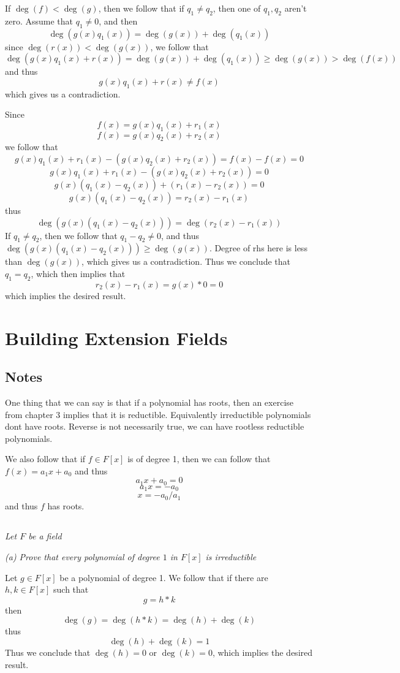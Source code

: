 \documentclass[11pt,oneside,titlepage]{book}
\begin{document}
If $\deg(f) < \deg(g)$, then we follow that if $q_1 \neq q_2$, then one of
$q_1, q_2$ aren't zero. Assume that $q_1 \neq 0$, and then
$$\deg(g(x)q_1(x)) = \deg(g(x)) + \deg(q_1(x))$$
since $\deg(r(x)) < \deg(g(x))$, we follow that
$$\deg(g(x)q_1(x) + r(x)) = \deg(g(x)) + \deg(q_1(x)) \geq \deg(g(x)) > \deg(f(x))$$
and thus
$$g(x)q_1(x) + r(x) \neq f(x)$$
which gives us a contradiction.

Since
$$f(x) = g(x) q_1(x) + r_1(x)$$
$$f(x) = g(x) q_2(x) + r_2(x)$$
we follow that
$$g(x) q_1(x) + r_1(x) - (g(x) q_2(x) + r_2(x)) = f(x) - f(x) = 0$$
$$g(x) q_1(x) + r_1(x) - (g(x) q_2(x) + r_2(x))  = 0$$
$$g(x) (q_1(x) - q_2(x)) + (r_1(x) -  r_2(x))  = 0$$
$$g(x) (q_1(x) - q_2(x)) = r_2(x) - r_1(x)$$
thus
$$\deg(g(x) (q_1(x) - q_2(x))) = \deg(r_2(x) - r_1(x))$$
If $q_1 \neq q_2$, then we follow that  $q_1 - q_2 \neq 0$, and thus
$\deg(g(x) (q_1(x) - q_2(x))) \geq \deg(g(x))$. Degree of rhs here is
less than $\deg(g(x))$, which gives us a contradiction. Thus we
conclude that $q_1 = q_2$, which then implies that
$$r_2(x) - r_1(x) = g(x) * 0 = 0$$
which implies the desired result.

\section{Building Extension Fields}

\subsection*{Notes}

One thing that we can say is that if a polynomial has roots,
then an exercise from chapter 3 implies that it is reductible.
Equivalently irreductible polynomials dont have roots.
Reverse is not necessarily true, we can have rootless reductible
polynomials.

We also follow that if $f \in F[x]$ is of degree 1, then
we can follow that $f(x) = a_1 x + a_0$
and thus
$$a_1 x + a_0 = 0$$
$$a_1 x = - a_0$$
$$ x = - a_0 / a_1$$
and thus $f$ has roots. 

\subsection{}

\textit{Let $F$ be a field}

\textit{(a) Prove that every polynomial of degree $1$ in $F[x]$ is irreductible}

Let $g \in F[x]$ be a polynomial of degree 1. We follow that if there
are $h, k \in F[x]$ such that
$$g = h * k$$
then
$$\deg(g) = \deg(h * k) = \deg(h) + \deg(k)$$
thus
$$\deg(h) + \deg(k) = 1$$
Thus we conclude that $\deg(h) = 0$ or $\deg(k) = 0$, which implies
the desired result.
\end{document}
